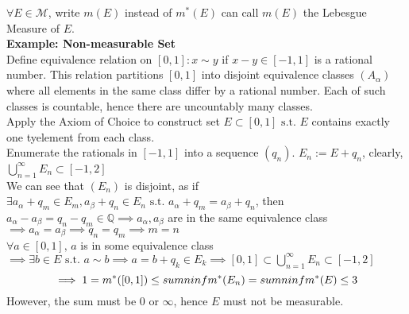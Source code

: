 \documentclass{article}
\newcommand{\sumninf}{\sum\limits_{n=1}^\infty}
\newcommand{\infcup}{\bigcup\limits_{n=1}^\infty}
\newcommand{\st}{\mbox{ s.t. }}
\newcommand{\0}{{\bf{0}}}
\newcommand{\1}{{\bf{1}}}
\begin{document}
$\forall E\in\mathcal{M}$, write $m(E)$ instead of $m^*(E)$ can call $m(E)$ the Lebesgue Measure of $E$.\\
\textbf{Example: Non-measurable Set}\\
Define equivalence relation on $[0,1]:x\sim y$ if $x-y\in[-1,1]$ is a rational number. This relation partitions $[0,1]$ into disjoint equivalence classes $(A_\alpha)$ where all elements in the same class differ by a rational number. Each of such classes is countable, hence there are uncountably many classes.\\
Apply the Axiom of Choice to construct set $E\subset[0,1]\st E$ contains exactly one tyelement from each class.\\
Enumerate the rationals in $[-1,1]$ into a sequence $(q_n)$. $E_n:=E+q_n$, clearly, $\infcup E_n\subset[-1,2]$\\
We can see that $(E_n)$ is disjoint, as if $\exists a_\alpha+q_m\in E_m,a_\beta+q_n\in E_n\st a_\alpha+q_m=a_\beta+q_n$, then $a_\alpha-a_\beta=q_n-q_m\in\mathbb{Q}\implies a_\alpha,a_\beta$ are in the same equivalence class$\implies a_\alpha=a_\beta\implies q_n=q_m\implies m=n$\\
$\forall a\in[0,1],\,a$ is in some equivalence class$\implies\exists b\in E\st a\sim b\implies a=b+q_k\in E_k\implies [0,1]\subset\infcup E_n\subset[-1,2]$
$$\implies1=m^*([0,1])\le\\sumninf m^*(E_n)=\\sumninf m^*(E)\le3$$
However, the sum must be $0$ or $\infty$, hence $E$ must not be measurable.
\end{document}
